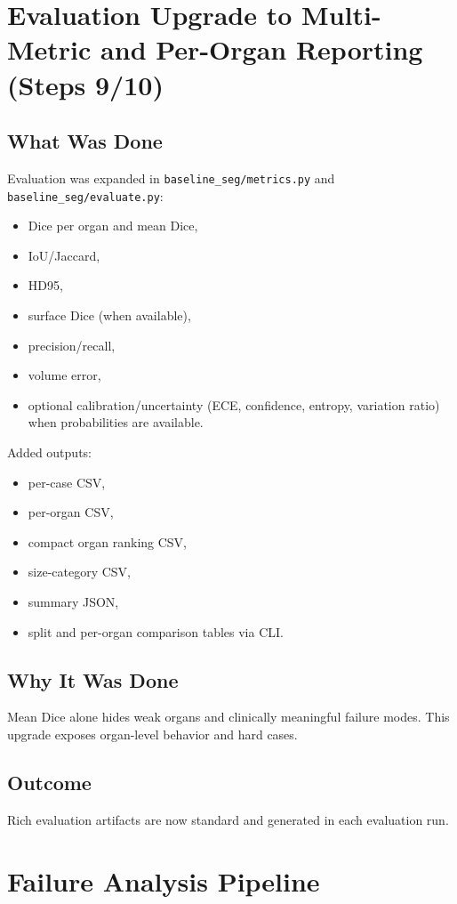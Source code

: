 \documentclass[11pt,a4paper]{article}
\begin{document}
\section{Evaluation Upgrade to Multi-Metric and Per-Organ Reporting (Steps 9/10)}
\subsection{What Was Done}
Evaluation was expanded in \texttt{baseline\_seg/metrics.py} and \texttt{baseline\_seg/evaluate.py}:
\begin{itemize}[leftmargin=1.5em]
  \item Dice per organ and mean Dice,
  \item IoU/Jaccard,
  \item HD95,
  \item surface Dice (when available),
  \item precision/recall,
  \item volume error,
  \item optional calibration/uncertainty (ECE, confidence, entropy, variation ratio) when probabilities are available.
\end{itemize}

Added outputs:
\begin{itemize}[leftmargin=1.5em]
  \item per-case CSV,
  \item per-organ CSV,
  \item compact organ ranking CSV,
  \item size-category CSV,
  \item summary JSON,
  \item split and per-organ comparison tables via CLI.
\end{itemize}

\subsection{Why It Was Done}
Mean Dice alone hides weak organs and clinically meaningful failure modes. This upgrade exposes organ-level behavior and hard cases.

\subsection{Outcome}
Rich evaluation artifacts are now standard and generated in each evaluation run.

\section{Failure Analysis Pipeline}
\end{document}
